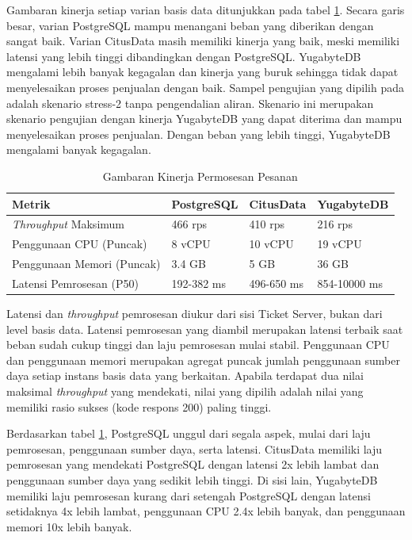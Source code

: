 Gambaran kinerja setiap varian basis data ditunjukkan pada tabel \ref{table:kinerja-pemrosesan-pesanan}. Secara garis besar, varian PostgreSQL mampu menangani beban yang diberikan dengan sangat baik. Varian CitusData masih memiliki kinerja yang baik, meski memiliki latensi yang lebih tinggi dibandingkan dengan PostgreSQL. YugabyteDB mengalami lebih banyak kegagalan dan kinerja yang buruk sehingga tidak dapat menyelesaikan proses penjualan dengan baik. Sampel pengujian yang dipilih pada adalah skenario stress-2 tanpa pengendalian aliran. Skenario ini merupakan skenario pengujian dengan kinerja YugabyteDB yang dapat diterima dan mampu menyelesaikan proses penjualan. Dengan beban yang lebih tinggi, YugabyteDB mengalami banyak kegagalan.

\begin{table}[h]
    \centering
    \caption{Gambaran Kinerja Permosesan Pesanan}
    \label{table:kinerja-pemrosesan-pesanan}
    \begin{tabular}{|l|l|l|l|}
        \hline
        \textbf{Metrik}              & \textbf{PostgreSQL} & \textbf{CitusData} & \textbf{YugabyteDB} \\
        \hline
        \textit{Throughput} Maksimum & 466 rps             & 410 rps            & 216 rps             \\
        \hline
        Penggunaan CPU (Puncak)      & 8 vCPU              & 10 vCPU            & 19 vCPU             \\
        \hline
        Penggunaan Memori (Puncak)   & 3.4 GB              & 5 GB               & 36 GB               \\
        \hline
        Latensi Pemrosesan (P50)     & 192-382 ms          & 496-650 ms         & 854-10000 ms        \\
        \hline
    \end{tabular}
\end{table}

Latensi dan \textit{throughput} pemrosesan diukur dari sisi Ticket Server, bukan dari level basis data. Latensi pemrosesan yang diambil merupakan latensi terbaik saat beban sudah cukup tinggi dan laju pemrosesan mulai stabil. Penggunaan CPU dan penggunaan memori merupakan agregat puncak jumlah penggunaan sumber daya setiap instans basis data yang berkaitan. Apabila terdapat dua nilai maksimal \textit{throughput} yang mendekati, nilai yang dipilih adalah nilai yang memiliki rasio sukses (kode respons 200) paling tinggi.

Berdasarkan tabel \ref{table:kinerja-pemrosesan-pesanan}, PostgreSQL unggul dari segala aspek, mulai dari laju pemrosesan, penggunaan sumber daya, serta latensi. CitusData memiliki laju pemrosesan yang mendekati PostgreSQL dengan latensi 2x lebih lambat dan penggunaan sumber daya yang sedikit lebih tinggi. Di sisi lain, YugabyteDB memiliki laju pemrosesan kurang dari setengah PostgreSQL dengan latensi setidaknya 4x lebih lambat, penggunaan CPU 2.4x lebih banyak, dan penggunaan memori 10x lebih banyak.


